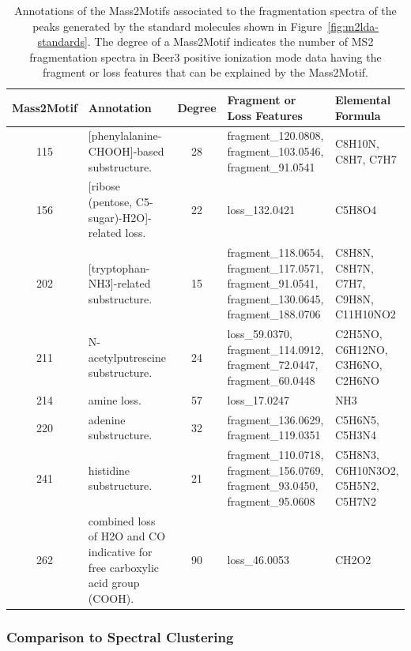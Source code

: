 \begin{table}
\small
\begin{centering}
\begin{tabular}{| c | p{4cm} | c | p{3.5cm} | p{2.5cm} |}
\hline 
Mass2Motif & Annotation & Degree & Fragment or Loss Features & Elemental Formula\tabularnewline
\hline 
\hline 
115 & {[}phenylalanine-CHOOH{]}-based substructure.  & 28 & fragment\_120.0808, fragment\_103.0546, fragment\_91.0541 & C8H10N, \newline C8H7, \newline C7H7\tabularnewline
\hline 
156 & {[}ribose (pentose, C5-sugar)-H2O{]}-related loss.  & 22 & loss\_132.0421 & C5H8O4 \tabularnewline
\hline 
202 & {[}tryptophan-NH3{]}-related substructure.  & 15 & fragment\_118.0654, 
fragment\_117.0571, 
fragment\_91.0541, 
fragment\_130.0645,
fragment\_188.0706 & C8H8N, \newline
C8H7N, \newline
C7H7, \newline
C9H8N, \newline
C11H10NO2\tabularnewline
\hline 
211 & N-acetylputrescine substructure.  & 24 & loss\_59.0370, \newline
fragment\_114.0912, 
fragment\_72.0447, 
fragment\_60.0448 & C2H5NO, 
C6H12NO, C3H6NO, 
C2H6NO\tabularnewline
\hline 
214 & amine loss.  & 57 & loss\_17.0247  & NH3\tabularnewline
\hline 
220 & adenine substructure.  & 32 & fragment\_136.0629, 
fragment\_119.0351 & C5H6N5, 
C5H3N4\tabularnewline
\hline 
241 & histidine substructure.  & 21 & fragment\_110.0718, 
fragment\_156.0769, 
fragment\_93.0450, 
fragment\_95.0608 & C5H8N3, 
C6H10N3O2, 
C5H5N2, 
C5H7N2\tabularnewline
\hline 
262 & combined loss of H2O and CO \textendash{} indicative for free carboxylic
acid group (COOH).  & 90 & loss\_46.0053  & CH2O2 \tabularnewline
\hline 
\end{tabular}
\par\end{centering}
\caption{Annotations of the Mass2Motifs associated to the fragmentation spectra
of the peaks generated by the standard molecules shown in Figure~\ref{fig:m2lda-standards}. The degree of
a Mass2Motif indicates the number of MS2 fragmentation spectra in
Beer3 positive ionization mode data having the fragment or loss features
that can be explained by the Mass2Motif. \label{tab:ms2lda-standards}}
\end{table}

\subsubsection{Comparison to Spectral Clustering}

